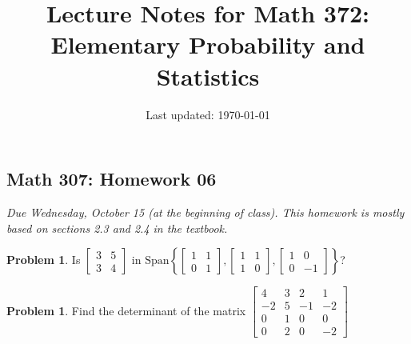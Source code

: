 \documentclass[10pt]{article}
\title{Lecture Notes for Math 372: \\Elementary Probability and Statistics}
\date{Last updated: \today}
\theoremstyle{definition}
\newtheorem{problem}[theorem]{Problem}
\newcommand{\1}[1]{\textbf{1}_{\left[#1\right]}} %
\begin{document}
\begin{center}
  \section*{Math 307: Homework 06}
  \textit{Due Wednesday, October 15 (at the beginning of class). This homework
  is mostly based on sections 2.3 and 2.4 in the textbook.}
\end{center}




\begin{problem}
  Is $
  \begin{bmatrix}
    3&5\\3&4
  \end{bmatrix}
  $ in $\text{Span} \left\{
    \begin{bmatrix}
      1&1\\
      0&1
    \end{bmatrix},
    \begin{bmatrix}
      1&1\\
      1&0
    \end{bmatrix},
    \begin{bmatrix}
      1&0\\
      0&-1
    \end{bmatrix}
  \right\}$?
\end{problem}


\begin{problem}
  Find the determinant of the matrix $
  \begin{bmatrix}
    4&3&2&1\\
    -2&5&-1&-2\\
    0&1&0&0\\
    0&2&0&-2
  \end{bmatrix}
  $
\end{problem}
\end{document}
